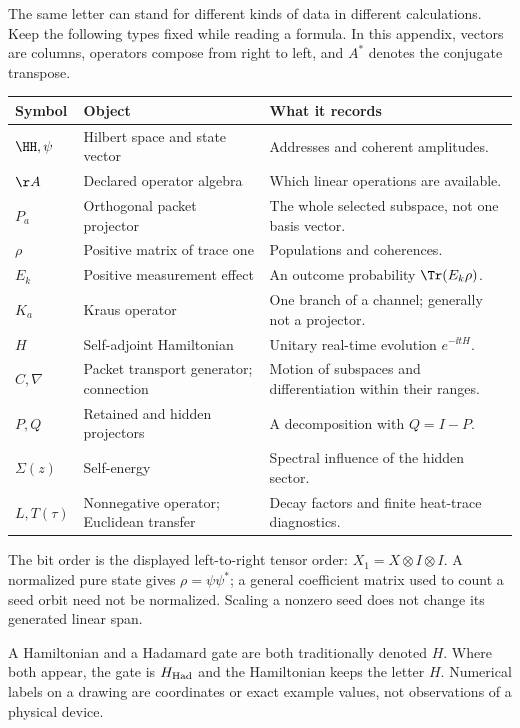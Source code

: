 The same letter can stand for different kinds of data in different calculations. Keep the following types fixed while reading a formula. In this appendix, vectors are columns, operators compose from right to left, and $A^*$ denotes the conjugate transpose.
\par\vspace{4pt}
\begin{tabularx}{\linewidth}{@{}p{.13\linewidth}YY@{}}
\toprule
Symbol & Object & What it records\\\midrule
$\HH,\psi$ & Hilbert space and state vector & Addresses and coherent amplitudes.\\
$\AA$ & Declared operator algebra & Which linear operations are available.\\
$P_a$ & Orthogonal packet projector & The whole selected subspace, not one basis vector.\\
$\rho$ & Positive matrix of trace one & Populations and coherences.\\
$E_k$ & Positive measurement effect & An outcome probability $\Tr(E_k\rho)$.\\
$K_a$ & Kraus operator & One branch of a channel; generally not a projector.\\
$H$ & Self-adjoint Hamiltonian & Unitary real-time evolution $e^{-\ii tH}$.\\
$C,\nabla$ & Packet transport generator; connection & Motion of subspaces and differentiation within their ranges.\\
$P,Q$ & Retained and hidden projectors & A decomposition with $Q=I-P$.\\
$\Sigma(z)$ & Self-energy & Spectral influence of the hidden sector.\\
$L,T(\tau)$ & Nonnegative operator; Euclidean transfer & Decay factors and finite heat-trace diagnostics.\\\bottomrule
\end{tabularx}
The bit order is the displayed left-to-right tensor order: $X_1=X\otimes I\otimes I$. A normalized pure state gives $\rho=\psi\psi^*$; a general coefficient matrix used to count a seed orbit need not be normalized. Scaling a nonzero seed does not change its generated linear span.

A Hamiltonian and a Hadamard gate are both traditionally denoted $H$. Where both appear, the gate is $H_{\rm Had}$ and the Hamiltonian keeps the letter $H$. Numerical labels on a drawing are coordinates or exact example values, not observations of a physical device.

